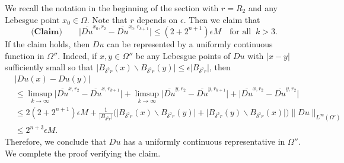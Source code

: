 \documentclass[reqno]{amsart}
\numberwithin{equation}{section}
\theoremstyle{plain}
\theoremstyle{definition}
\theoremstyle{remark}
\providecommand{\abs}[1]{\lvert#1\rvert}
\providecommand{\bigabs}[1]{\bigl\lvert#1\bigr\rvert}
\providecommand{\norm}[1]{\lVert#1\rVert}
\begin{document}
We recall the notation in the beginning of the section with $r=R_2$ and any Lebesgue point $x_0\in \Omega$. Note that $r$ depends on $\epsilon$.  
Then we claim that
\[
\textbf{(Claim)}\qquad \bigabs{ \overline{Du}^{x_0 ,r_2}  -\overline{Du}^{x_0 ,r_{k+1}}} \leq (2+2^{n+1})\epsilon M 
\quad \text{for all $\ k> 3$.}
\]
If the claim holds, then $Du$ can be represented by a uniformly continuous function in $\Omega''$. Indeed,  if $x, y\in \Omega''$ be any Lebesgue points of $Du$ with $\abs{x-y}$ sufficiently small so that $\abs{B_{\delta^2r}(x)\backslash B_{\delta^2r}(y)}\leq \epsilon\abs{B_{\delta^2r}}$, then
\begin{align*}
&\abs{Du(x)-Du(y)} \\
&\leq \limsup_{k\rightarrow\infty}\bigabs{ \overline{Du}^{x ,r_2}  -\overline{Du}^{x ,r_{k+1}}} +\limsup_{k\rightarrow\infty}\bigabs{ \overline{Du}^{y ,r_2}  -\overline{Du}^{y ,r_{k+1}}} + \bigabs{ \overline{Du}^{x ,r_2}  -\overline{Du}^{y ,r_{2}}}\\
&\leq 2 (2+2^{n+1})\epsilon M+\frac{1}{\abs{B_{\delta^2r}}} \big(\abs{B_{\delta^2r}(x)\backslash B_{\delta^2r}(y)} +\abs{B_{\delta^2r}(y)\backslash B_{\delta^2r}(x)} \big)\norm{Du}_{L^\infty(\Omega')} \\
&\leq 2^{n+3} \epsilon M.
\end{align*}
Therefore, we conclude that $Du$ has a uniformly continuous representative in $\Omega''$. We complete the proof verifying the claim.
\end{document}
